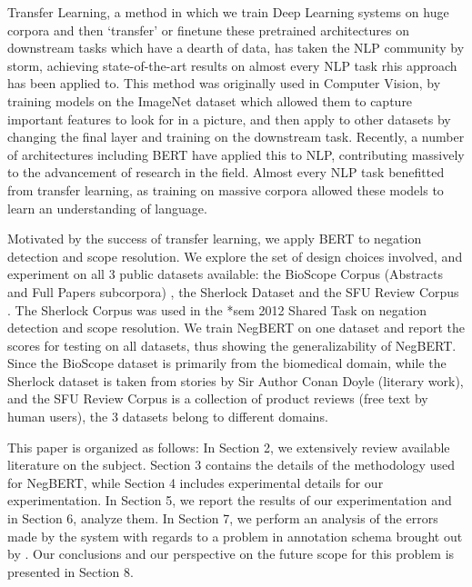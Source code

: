 \documentclass[10pt, a4paper]{article}
\begin{document}
\par Transfer Learning, a method in which we train Deep Learning systems on huge corpora and then ‘transfer’ or finetune these pretrained architectures on downstream tasks which have a dearth of data, has taken the NLP community by storm, achieving state-of-the-art results on almost every NLP task rhis approach has been applied to. This method was originally used in Computer Vision, by training models on the ImageNet dataset which allowed them to capture important features to look for in a picture, and then apply to other datasets by changing the final layer and training on the downstream task. Recently, a number of architectures including BERT \cite{bert} have applied this to NLP, contributing massively to the advancement of research in the field. Almost every NLP task benefitted from transfer learning, as training on massive corpora allowed these models to learn an understanding of language.
\par Motivated by the success of transfer learning, we apply BERT to negation detection and scope resolution. We explore the set of design choices involved, and experiment on all 3 public datasets available: the BioScope Corpus (Abstracts and Full Papers subcorpora) \cite{szarvas-etal-2008-bioscope}, the Sherlock Dataset \cite{morante-blanco-2012-sem} and the SFU Review Corpus \cite{konstantinova-etal-2012-review}. The Sherlock Corpus was used in the *sem 2012 Shared Task on negation detection and scope resolution.  We train NegBERT on one dataset and report the scores for testing on all datasets, thus showing the generalizability of NegBERT. Since the BioScope dataset is primarily from the biomedical domain, while the Sherlock dataset is taken from stories by Sir Author Conan Doyle (literary work), and the SFU Review Corpus is a collection of product reviews (free text by human users), the 3 datasets belong to different domains.
\par This paper is organized as follows: In Section 2, we extensively review available literature on the subject. Section 3 contains the details of the methodology used for NegBERT, while Section 4 includes experimental details for our experimentation. In Section 5, we report the results of our experimentation and in Section 6, analyze them. In Section 7, we perform an analysis of the errors made by the system with regards to a problem in annotation schema brought out by . Our conclusions and our perspective on the future scope for this problem is presented in Section 8.
\end{document}

